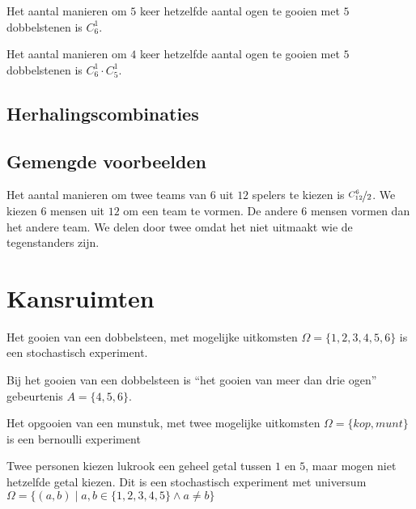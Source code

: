 \documentclass[main.tex]{subfiles}
\begin{document}
\begin{vb}
  Het aantal manieren om $5$ keer hetzelfde aantal ogen te gooien met $5$ dobbelstenen is $C_{6}^{1}$.
\end{vb}

\begin{vb}
  Het aantal manieren om $4$ keer hetzelfde aantal ogen te gooien met $5$ dobbelstenen is $C_{6}^{1}\cdot C_{5}^{1}$.
\end{vb}

\subsection*{Herhalingscombinaties}

\subsection{Gemengde voorbeelden}

\begin{vb}
  Het aantal manieren om twee teams van $6$ uit $12$ spelers te kiezen is $\nicefrac{C^{6}_{12}}{2}$.
  We kiezen $6$ mensen uit $12$ om een team te vormen.
  De andere $6$ mensen vormen dan het andere team.
  We delen door twee omdat het niet uitmaakt wie de tegenstanders zijn.
\end{vb}



\newpage 
\section{Kansruimten}

\begin{vb}
  Het gooien van een dobbelsteen, met mogelijke uitkomsten $\Omega = \{1,2,3,4,5,6\}$ is een stochastisch experiment.
\end{vb}

\begin{vb}
  Bij het gooien van een dobbelsteen is ``het gooien van meer dan drie ogen'' gebeurtenis $A =\{4,5,6\}$.
\end{vb}

\begin{vb}
  Het opgooien van een munstuk, met twee mogelijke uitkomsten $\Omega = \{kop, munt\}$ is een bernoulli experiment
\end{vb}

\begin{vb}
  Twee personen kiezen lukrook een geheel getal tussen $1$ en $5$, maar mogen niet hetzelfde getal kiezen.
  Dit is een stochastisch experiment met universum $\Omega = \{ (a,b) \mid a,b \in \{1,2,3,4,5 \} \wedge a \neq b \}$
\end{vb}
\end{document}
